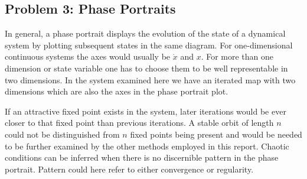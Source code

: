 \subsection{Problem 3: Phase Portraits}
In general, a phase portrait displays the evolution of the state of a dynamical system by plotting subsequent states in the same diagram.
For one-dimensional continuous systems the axes would usually be $\dot{x}$ and $x$.
For more than one dimension or state variable one has to choose them to be well representable in two dimensions.
In the system examined here we have an iterated map with two dimensions which are also the axes in the phase portrait plot.

If an attractive fixed point exists in the system, later iterations would be ever closer to that fixed point than previous iterations.
A stable orbit of length $n$ could not be distinguished from $n$ fixed points being present and would be needed to be further examined by the other methods employed in this report.
Chaotic conditions can be inferred when there is no discernible pattern in the phase portrait.
Pattern could here refer to either convergence or regularity.
